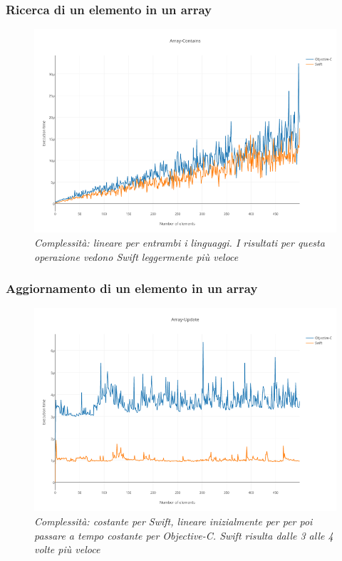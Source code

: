 \subsubsection{Ricerca di un elemento in un array}
\begin{figure}[H]
      \centering
      \includegraphics[scale=0.50]{immagini/array_contains.png}
            \vspace{0.8cm}
            \caption{\textit{Complessità: lineare per entrambi i linguaggi. I risultati per questa operazione vedono Swift leggermente più veloce}}
\end{figure}
\subsubsection{Aggiornamento di un elemento in un array}
\begin{figure}[H]
      \centering
      \includegraphics[scale=0.50]{immagini/array_update.png}
            \vspace{0.8cm}
            \caption{\textit{Complessità: costante per Swift, lineare inizialmente per per poi passare a tempo costante per Objective-C. Swift risulta dalle 3 alle 4 volte più veloce}}
\end{figure}
